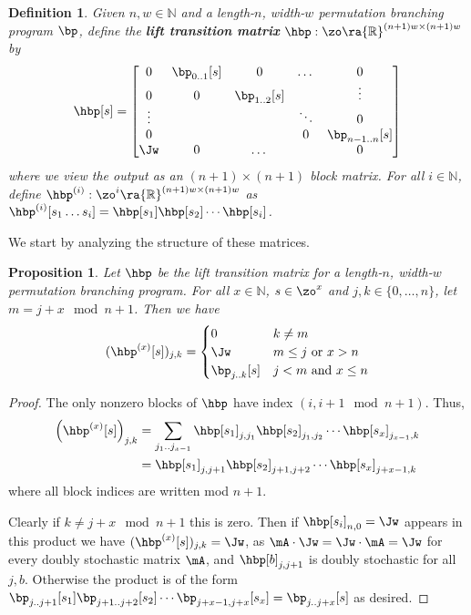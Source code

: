 \documentclass[11pt]{article}
\newtheorem{proposition}[theorem]{Proposition}
\newtheorem{definition}[theorem]{Definition}
\newcommand{\R}{{\mathbb R}}
\newcommand{\N}{{\mathbb N}}
\begin{document}
\begin{definition}\label{def:hbp}
Given $n,w\in \N$ and a length-$n$, width-$w$ permutation branching program $\bp$, define the \textbf{lift transition matrix} $\hbp:\zo\ra \R^{(n+1)w\times(n+1)w}$ by
\[\hbp[s] = \begin{bmatrix}
0 & \bp_{0..1}[s] & 0 & \dots & 0\\
0 & 0 & \bp_{1..2}[s] &  & \vdots\\
\vdots & &  & \ddots & 0\\
0 & ~ &   & 0 & \bp_{n-1..n}[s]\\
\Jw & 0 & \dots & & 0\\
\end{bmatrix}\]
where we view the output as an $(n+1)\times(n+1)$ block matrix. For all $i\in\N$, define $\hbp^{(i)}:\zo^{i}\ra \R^{(n+1)w\times(n+1)w}$ as $\hbp^{(i)}[s_1\dots s_i]=\hbp[s_1]\hbp[s_2]\cdots\hbp[s_{i}]$.
\end{definition}

We start by analyzing the structure of these matrices.
\begin{proposition}\label{prop:HBPstruct}
Let $\hbp$ be the lift transition matrix for a length-$n$, width-$w$ permutation branching program. %
For  %
all $x \in \N$, $s \in \zo^x$ and $j,k\in \{0,\ldots,n\}$, let $m=j+x\mod n+1$. 
%
Then we have  %
\[(\hbp^{(x)}[s])_{j,k} = \begin{cases}
0 & k\neq m\\
\Jw & m \leq j \text{ or } x>n\\
\bp_{j..k}[s] & j < m \text{ and } x\leq n
\end{cases}\]
\end{proposition}
\begin{proof}
The only nonzero blocks of $\hbp$ have index $(i,i+1 \mod n+1)$. Thus, 
\begin{align*}
    \left(\hbp^{(x)}[s]\right)_{j,k} &= \sum_{j_1..j_{x-1}}\hbp[s_1]_{j,j_1}\hbp[s_2]_{j_1,j_2}\cdots \hbp[s_x]_{j_{x-1},k}\\
    &= \hbp[s_1]_{j,j+1}\hbp[s_2]_{j+1,j+2}\cdots \hbp[s_x]_{j+x-1,k} %
\end{align*}
%
where %
all block indices are written mod $n+1$.

Clearly if $k\neq j+x\mod n+1$ this is zero. Then if $\hbp[s_i]_{n,0}=\Jw$ appears in this product we have $(\hbp^{(x)}[s])_{j,k}=\Jw$, as $\mA\cdot\Jw=\Jw\cdot\mA=\Jw$ for every doubly stochastic matrix $\mA$, and $\hbp[b]_{j,j+1}$ is doubly stochastic for all $j,b$. Otherwise the product is of the form $\bp_{j..j+1}[s_1]\bp_{j+1..j+2}[s_2]\cdots \bp_{j+x-1,j+x}[s_x]=\bp_{j..j+x}[s]$ as desired.
\end{proof}
\end{document}
